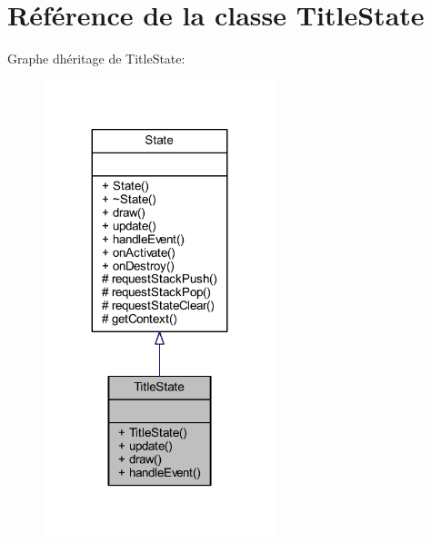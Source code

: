\hypertarget{class_title_state}{}\section{Référence de la classe Title\+State}
\label{class_title_state}


Graphe d\textquotesingle{}héritage de Title\+State\+:\nopagebreak
\begin{figure}[H]
\begin{center}
\leavevmode
\includegraphics[width=191pt]{class_title_state__inherit__graph}
\end{center}
\end{figure}


